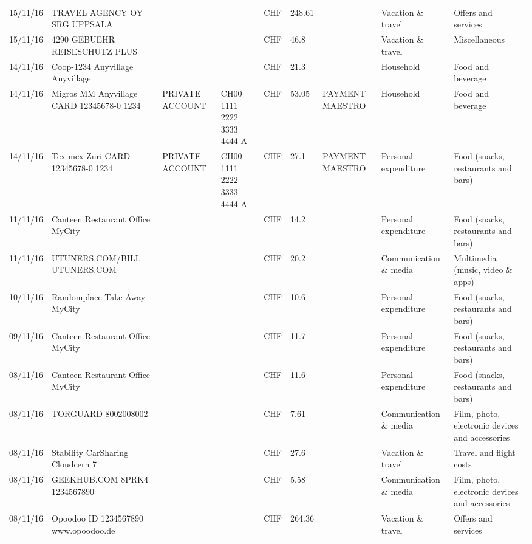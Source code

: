 \begin{landscape}
\begin{table}[t]
\begin{center}
\begin{tabular}{lllllllll}
		15/11/16 & TRAVEL AGENCY OY SRG     UPPSALA &       &       & CHF   & 248.61 &       & Vacation \& travel & Offers and services \\
		15/11/16 & 4290 GEBUEHR REISESCHUTZ PLUS &       &       & CHF   & 46.8  &       & Vacation \& travel & Miscellaneous \\
		14/11/16 & Coop-1234 Anyvillage    Anyvillage &       &       & CHF   & 21.3  &       & Household & Food and beverage \\
		14/11/16 & Migros MM Anyvillage CARD 12345678-0 1234 & PRIVATE ACCOUNT & CH00 1111 2222 3333 4444 A & CHF   & 53.05 & PAYMENT MAESTRO & Household & Food and beverage \\
		14/11/16 & Tex mex Zuri CARD 12345678-0 1234 & PRIVATE ACCOUNT & CH00 1111 2222 3333 4444 A & CHF   & 27.1  & PAYMENT MAESTRO & Personal expenditure & Food (snacks, restaurants and bars) \\
		11/11/16 & Canteen Restaurant Office      MyCity &       &       & CHF   & 14.2  &       & Personal expenditure & Food (snacks, restaurants and bars) \\
		11/11/16 & UTUNERS.COM/BILL          UTUNERS.COM &       &       & CHF   & 20.2  &       & Communication \& media & Multimedia (music, video \& apps) \\
		10/11/16 & Randomplace Take Away     MyCity &       &       & CHF   & 10.6  &       & Personal expenditure & Food (snacks, restaurants and bars) \\
		09/11/16 & Canteen Restaurant Office      MyCity &       &       & CHF   & 11.7  &       & Personal expenditure & Food (snacks, restaurants and bars) \\
		08/11/16 & Canteen Restaurant Office      MyCity &       &       & CHF   & 11.6  &       & Personal expenditure & Food (snacks, restaurants and bars) \\
		08/11/16 & TORGUARD                 8002008002 &       &       & CHF   & 7.61  &       & Communication \& media & Film, photo, electronic devices and accessories \\
		08/11/16 & Stability CarSharing      Cloudcern 7 &       &       & CHF   & 27.6  &       & Vacation \& travel & Travel and flight costs \\
		08/11/16 & GEEKHUB.COM  8PRK4        1234567890 &       &       & CHF   & 5.58  &       & Communication \& media & Film, photo, electronic devices and accessories \\
		08/11/16 & Opoodoo ID 1234567890      www.opoodoo.de &       &       & CHF   & 264.36 &       & Vacation \& travel & Offers and services \\

\end{tabular}
\end{center}
\end{table}
\end{landscape}
